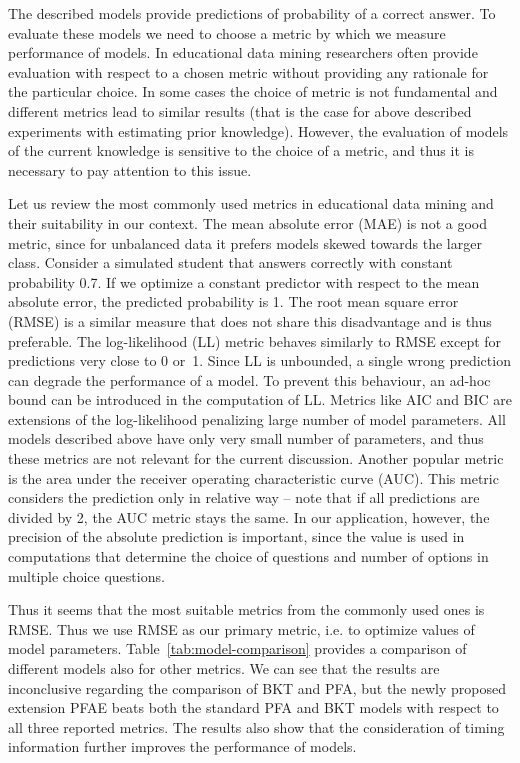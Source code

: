 \documentclass{edm_template}
\begin{document}
The described models provide predictions of probability of a correct answer. To
evaluate these models we need to choose a metric by which we measure
performance of models. In educational data mining researchers often provide
evaluation with respect to a chosen metric without providing any rationale for
the particular choice. In some cases the choice of metric is not fundamental
and different metrics lead to similar results (that is the case for above
described experiments with estimating prior knowledge). However, the evaluation
of models of the current knowledge is sensitive to the choice of a metric, and
thus it is necessary to pay attention to this issue.

Let us review the most commonly used metrics in educational data mining and
their suitability in our context. The mean absolute error (MAE) is not a good
metric, since for unbalanced data it prefers models skewed towards the larger
class. Consider a simulated student that answers correctly with constant
probability 0.7. If we optimize a constant predictor with respect to the mean
absolute error, the predicted probability is 1. The root mean square error
(RMSE) is a similar measure that does not share this disadvantage and is thus
preferable. The log-likelihood (LL) metric behaves similarly to RMSE except for
predictions very close to 0 or~1. Since LL is unbounded, a single wrong
prediction can degrade the performance of a model. To prevent this behaviour,
an ad-hoc bound can be introduced in the computation of LL. Metrics like AIC
and BIC are extensions of the log-likelihood penalizing large number of model
parameters. All models described above have only very small number of
parameters, and thus these metrics are not relevant for the current discussion.
Another popular metric is the area under the receiver operating characteristic
curve (AUC). This metric considers the prediction only in relative way -- note
that if all predictions are divided by 2, the AUC metric stays the same. In our
application, however, the precision of the absolute prediction is important,
since the value is used in computations that determine the choice of questions
and number of options in multiple choice questions.

Thus it seems that the most suitable metrics from the commonly used ones is
RMSE. Thus we use RMSE as our primary metric, i.e. to optimize values of model
parameters. Table~\ref{tab:model-comparison} provides a comparison of different
models also for other metrics. We can see that the results are inconclusive
regarding the comparison of BKT and PFA, but the newly proposed extension PFAE
beats both the standard PFA and BKT models with respect to all three reported
metrics. The results also show that the consideration of timing information
further improves the performance of models.
\end{document}
